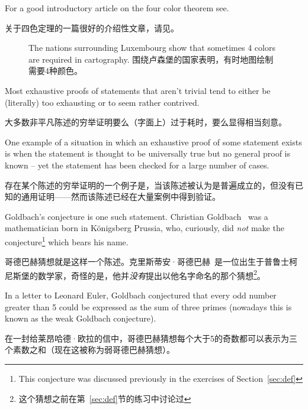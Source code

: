 For a  good introductory article on
the four color theorem see\cite{wiki-4color}.

关于四色定理的一篇很好的介绍性文章，请见\cite{wiki-4color}。

\begin{figure}[!hbtp]
      \begin{center}
            
      \end{center}
      \caption[A four-color map.四色地图]{The nations surrounding %
             Luxembourg show %
            that sometimes 4 colors are required in cartography. 围绕卢森堡的国家表明，有时地图绘制需要4种颜色。}
      \label{fig:Lux_map}
\end{figure}

Most exhaustive proofs of statements that aren't trivial tend to either be (literally) too exhausting or to seem rather contrived.

大多数非平凡陈述的穷举证明要么（字面上）过于耗时，要么显得相当刻意。

One example of a situation
in which an exhaustive proof of some statement exists is when the statement
is thought to be universally true but no general proof is known -- yet the
statement has been checked for a large number of cases.

存在某个陈述的穷举证明的一个例子是，当该陈述被认为是普遍成立的，但没有已知的通用证明——然而该陈述已经在大量案例中得到验证。

Goldbach's conjecture
is one such statement.
Christian Goldbach~\cite{wiki-goldbach}
was a mathematician born
in K\"{o}nigsberg Prussia,
who, curiously, did \emph{not} make the
conjecture\footnote{This conjecture was %
      discussed previously in the exercises of Section~\ref{sec:def}} which bears
his name.

哥德巴赫猜想就是这样一个陈述。克里斯蒂安·哥德巴赫~\cite{wiki-goldbach}是一位出生于普鲁士柯尼斯堡的数学家，奇怪的是，他并\emph{没有}提出以他名字命名的那个猜想\footnote{这个猜想之前在第~\ref{sec:def}节的练习中讨论过}。

In a letter to
Leonard Euler, Goldbach conjectured that every
odd number greater than 5 could be expressed as the sum of three primes (nowadays this is known as the
 weak Goldbach conjecture).

在一封给莱昂哈德·欧拉的信中，哥德巴赫猜想每个大于5的奇数都可以表示为三个素数之和（现在这被称为弱哥德巴赫猜想）。

